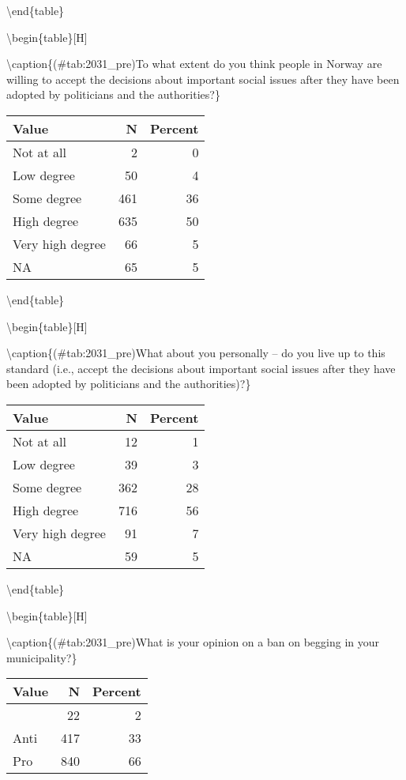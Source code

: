 \documentclass[
]{book}
\begin{document}
\textbackslash end\{table\}

\textbackslash begin\{table\}{[}H{]}

\textbackslash caption\{(\#tab:2031\_pre)To what extent do you think people in Norway are willing to accept the decisions about important social issues after they have been adopted by politicians and the authorities?\}
\centering

\begin{tabular}[t]{lrr}
\toprule
Value & N & Percent\\
\midrule
Not at all & 2 & 0\\
Low degree & 50 & 4\\
Some degree & 461 & 36\\
High degree & 635 & 50\\
Very high degree & 66 & 5\\
NA & 65 & 5\\
\bottomrule
\end{tabular}

\textbackslash end\{table\}

\textbackslash begin\{table\}{[}H{]}

\textbackslash caption\{(\#tab:2031\_pre)What about you personally -- do you live up to this standard (i.e., accept the decisions about important social issues after they have been adopted by politicians and the authorities)?\}
\centering

\begin{tabular}[t]{lrr}
\toprule
Value & N & Percent\\
\midrule
Not at all & 12 & 1\\
Low degree & 39 & 3\\
Some degree & 362 & 28\\
High degree & 716 & 56\\
Very high degree & 91 & 7\\
NA & 59 & 5\\
\bottomrule
\end{tabular}

\textbackslash end\{table\}

\textbackslash begin\{table\}{[}H{]}

\textbackslash caption\{(\#tab:2031\_pre)What is your opinion on a ban on begging in your municipality?\}
\centering

\begin{tabular}[t]{lrr}
\toprule
Value & N & Percent\\
\midrule
 & 22 & 2\\
Anti & 417 & 33\\
Pro & 840 & 66\\
\bottomrule
\end{tabular}
\end{document}
